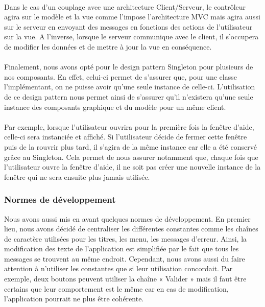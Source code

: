 \documentclass[a4paper,11pt]{article}
\begin{document}
\paragraph{} Dans le cas d'un couplage avec une architecture Client/Serveur, le contrôleur agira sur le modèle et la vue comme l'impose l'architecture MVC mais agira aussi sur le serveur en envoyant des messages en fonctions des actions de l'utilisateur sur la vue. A l'inverse, lorsque le serveur communique avec le client, il s'occupera de modifier les données et de mettre à jour la vue en conséquence.

\paragraph{} Finalement, nous avons opté pour le design pattern Singleton pour plusieurs de nos composants. En effet, celui-ci permet de s'assurer que, pour une classe l'implémentant, on ne puisse avoir qu'une seule instance de celle-ci. L'utilisation de ce design pattern nous permet ainsi de s'assurer qu'il n'existera qu'une seule instance des composants graphique et du modèle pour un même client.

\paragraph{} Par exemple, lorsque l'utilisateur ouvrira pour la première fois la fenêtre d'aide, celle-ci sera instanciée et affiché. Si l'utilisateur décide de fermer cette fenêtre puis de la rouvrir plus tard, il s'agira de la même instance car elle a été conservé grâce au Singleton. Cela permet de nous assurer notamment que, chaque fois que l'utilisateur ouvre la fenêtre d'aide, il ne soit pas créer une nouvelle instance de la fenêtre qui ne sera ensuite plus jamais utilisée.

\subsubsection{Normes de développement}
Nous avons aussi mis en avant quelques normes de développement. En premier lieu, nous avons décidé de centraliser les différentes constantes comme les chaînes de caractère utilisées pour les titres, les menu, les messages d'erreur. Ainsi, la modification des texte de l'application est simplifiée par le fait que tous les messages se trouvent au même endroit. Cependant, nous avons aussi du faire attention à n'utiliser les constantes que si leur utilisation concordait. Par exemple, deux boutons peuvent utiliser la chaîne « Valider » mais il faut être certains que leur comportement est le même car en cas de modification, l'application pourrait ne plus être cohérente.
\end{document}
